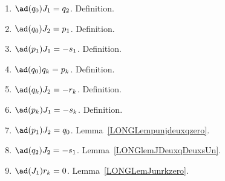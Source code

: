 \begin{enumerate}
	\item$\ad(q_0)J_1=q_2$. Definition.
	\item$\ad(q_0)J_2=p_1$. Definition.
	\item$\ad(p_1)J_1=-s_1$. Definition.
	\item$\ad(q_0)q_k=p_k$\label{LONGItemComqzpk}. Definition.
	\item$\ad(q_k)J_2=-r_k$. Definition.
	\item$\ad(p_k)J_1=-s_k$\label{LONGItemCompkJun}. Definition.
	\item$\ad(p_1)J_2=q_0$\label{LONGItemCompunJdeux}. Lemma~\ref{LONGLempunjdeuxqzero}.
	\item$\ad(q_2)J_2=-s_1$. Lemma~\ref{LONGlemJDeuxqDeuxsUn}.
	\item$\ad(J_1)r_k=0$\label{LONGItemComJunrk}. Lemma~\ref{LONGLemJunrkzero}.


\end{enumerate}

